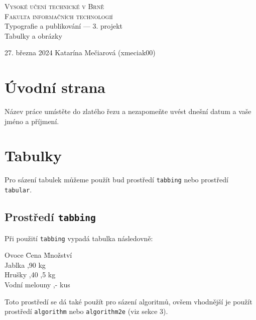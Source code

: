 \documentclass[11pt]{article}
\begin{document}
    \begin{titlepage}
        \begin{center}
            \Huge\textsc{Vysoké učení technické v Brně}\\
            \huge\textsc{Fakulta informačních technologií}\\
            {Typografie a publikování –– 3. projekt}\\
            \Huge{Tabulky a obrázky}\\
        \end{center}
        {\LARGE 27. března 2024 \hfill
        Katarína Mečiarová (xmeciak00)}

    \end{titlepage}

    \section{Úvodní strana}
        Název práce umístěte do zlatého řezu a nezapomeňte uvést dnešní datum a vaše jméno a příjmení.

    \section{Tabulky}
        Pro sázení tabulek můžeme použít bud prostředí \verb|tabbing| nebo prostředí \verb|tabular|.

        \subsection{Prostředí \verb|tabbing|}
            Při použití \verb|tabbing| vypadá tabulka následovně:
            \begin{tabbing}
                    Ovoce           \= Cena     \= Množství     \\
                    Jablka          ,90     kg         \\
                    Hrušky          ,40    ,5 kg       \\
                    Vodní melouny   ,-      kus        \\
            \end{tabbing}
            Toto prostředí se dá také použít pro sázení algoritmů, ovšem vhodnější je použít prostředí \verb|algorithm| nebo \verb|algorithm2e| (viz sekce 3).
\end{document}
